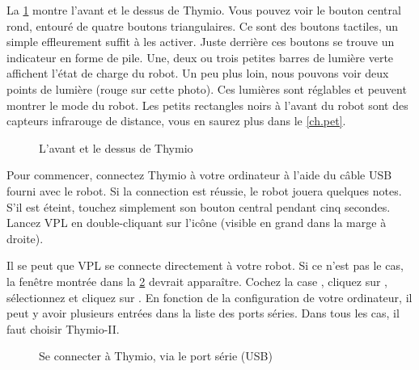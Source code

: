 

La \cref{fig.front} montre l'avant et le dessus de Thymio. Vous pouvez voir le bouton central rond, entouré de quatre boutons triangulaires. Ce sont des boutons tactiles, un simple effleurement suffit à les activer. Juste derrière ces boutons se trouve un indicateur en forme de pile. Une, deux ou trois petites barres de lumière verte affichent l'état de charge du robot. Un peu plus loin, nous pouvons voir deux points de lumière (rouge sur cette photo). Ces lumières sont réglables et peuvent montrer le mode du robot. Les petits rectangles noirs à l'avant du robot sont des capteurs infrarouge de distance, vous en saurez plus dans le \cref{ch.pet}.

\begin{figure}[h]
\begin{center}
\caption{L'avant et le dessus de Thymio}\label{fig.front}
\end{center}
\end{figure} 

\pagebreak


Pour commencer, connectez Thymio à votre ordinateur à l'aide du câble USB fourni avec le robot.
Si la connection est réussie, le robot jouera quelques notes.
S'il est éteint, touchez simplement son bouton central pendant cinq secondes.
Lancez VPL en double-cliquant sur l'icône  (visible en grand dans la marge à droite).

Il se peut que VPL se connecte directement à votre robot.
Si ce n'est pas le cas, la fenêtre montrée dans la \cref{fig.connect} devrait apparaître.
Cochez la case , cliquez sur , sélectionnez  et cliquez sur .
En fonction de la configuration de votre ordinateur, il peut y avoir plusieurs entrées dans la liste des ports séries.
Dans tous les cas, il faut choisir Thymio-II.

\vfill


\begin{figure}
\begin{center}
\caption{Se connecter à Thymio, via le port série (USB)}\label{fig.connect}
\end{center}
\end{figure}

